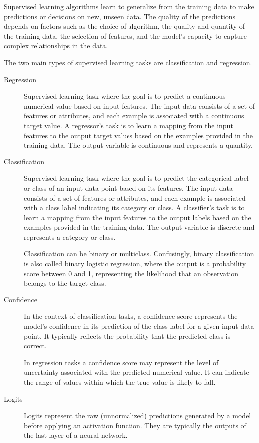 \documentclass[a4paper]{report}
\begin{document}
Supervised learning algorithms learn to generalize from the training data to make predictions or decisions on new, unseen data. The quality of the predictions depends on factors such as the choice of algorithm, the quality and quantity of the training data, the selection of features, and the model's capacity to capture complex relationships in the data.

The two main types of supervised learning tasks are classification and regression.

\begin{description}
\item[Regression]
Supervised learning task where the goal is to predict a continuous numerical value based on input features. The input data consists of a set of features or attributes, and each example is associated with a continuous target value. A regressor's task is to learn a mapping from the input features to the output target values based on the examples provided in the training data. The output variable is continuous and represents a quantity.
    
\item[Classification]
Supervised learning task where the goal is to predict the categorical label or class of an input data point based on its features. The input data consists of a set of features or attributes, and each example is associated with a class label indicating its category or class. A classifier's task is to learn a mapping from the input features to the output labels based on the examples provided in the training data. The output variable is discrete and represents a category or class.

Classification can be binary or multiclass. Confusingly, binary classification is also called binary logistic regression, where the output is a probability score between 0 and 1, representing the likelihood that an observation belongs to the target class.

\item[Confidence]
In the context of classification tasks, a confidence score represents the model's confidence in its prediction of the class label for a given input data point. It typically reflects the probability that the predicted class is correct. 

In regression tasks a confidence score may represent the level of uncertainty associated with the predicted numerical value. It can indicate the range of values within which the true value is likely to fall.

\item[Logits]
Logits represent the raw (unnormalized) predictions generated by a model before applying an activation function. They are typically the outputs of the last layer of a neural network.


\end{description}
\end{document}
